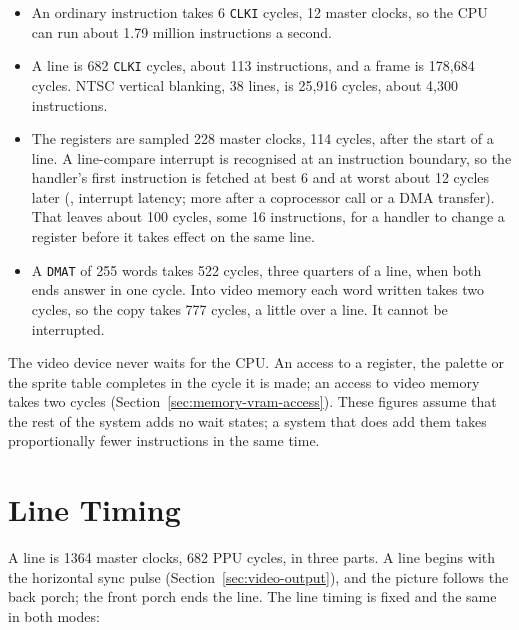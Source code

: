 \begin{itemize}
	\item An ordinary instruction takes 6 \texttt{CLKI} cycles, 12 master clocks, so the CPU can run about 1.79 million
	      instructions a second.
	\item A line is 682 \texttt{CLKI} cycles, about 113 instructions, and a frame is 178,684 cycles. NTSC vertical blanking, 38
	      lines, is 25,916 cycles, about 4,300 instructions.
	\item The registers are sampled 228 master clocks, 114 cycles, after the start of a line. A line-compare interrupt is
	      recognised at an instruction boundary, so the handler's first instruction is fetched at best 6 and at worst about 12
	      cycles later (\archmanual{}, interrupt latency; more after a coprocessor call or a DMA transfer). That leaves about 100
	      cycles, some 16 instructions, for a handler to change a register before it takes effect on the same line.
	\item A \texttt{DMAT} of 255 words takes 522 cycles, three quarters of a line, when both ends answer in one cycle. Into video
	      memory each word written takes two cycles, so the copy takes 777 cycles, a little over a line. It cannot be
	      interrupted.
\end{itemize}

The video device never waits for the CPU. An access to a register, the palette or the sprite table completes in the
cycle it is made; an access to video memory takes two cycles (Section~\ref{sec:memory-vram-access}). These figures
assume that the rest of the system adds no wait states; a system that does add them takes proportionally fewer
instructions in the same time.

\section{Line Timing}

A line is 1364 master clocks, 682 PPU cycles, in three parts. A line begins with the horizontal sync pulse
(Section~\ref{sec:video-output}), and the picture follows the back porch; the front porch ends the line. The line
timing is fixed and the same in both modes:

